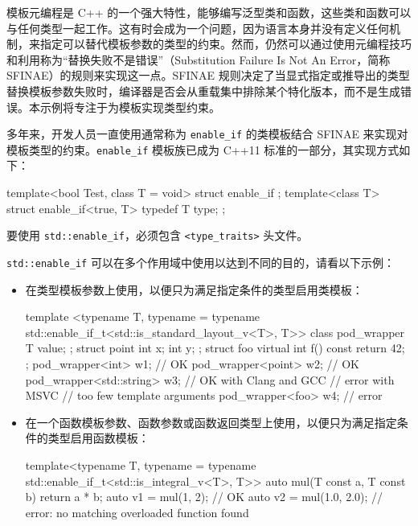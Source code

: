 
模板元编程是 C++ 的一个强大特性，能够编写泛型类和函数，这些类和函数可以与任何类型一起工作。这有时会成为一个问题，因为语言本身并没有定义任何机制，来指定可以替代模板参数的类型的约束。然而，仍然可以通过使用元编程技巧和利用称为“替换失败不是错误”（Substitution Failure Is Not An Error，简称 SFINAE）的规则来实现这一点。SFINAE 规则决定了当显式指定或推导出的类型替换模板参数失败时，编译器是否会从重载集中排除某个特化版本，而不是生成错误。本示例将专注于为模板实现类型约束。


多年来，开发人员一直使用通常称为 \verb|enable_if| 的类模板结合 SFINAE 来实现对模板类型的约束。\verb|enable_if| 模板族已成为 C++11 标准的一部分，其实现方式如下：

\begin{cpp}
template<bool Test, class T = void>
struct enable_if
{};
template<class T>
struct enable_if<true, T>
{
    typedef T type;
};
\end{cpp}

要使用 \verb|std::enable_if|，必须包含 \verb|<type_traits>| 头文件。


\verb|std::enable_if| 可以在多个作用域中使用以达到不同的目的，请看以下示例：

\begin{itemize}
\item
在类型模板参数上使用，以便只为满足指定条件的类型启用类模板：

\begin{cpp}
template <typename T,
          typename = typename
          std::enable_if_t<std::is_standard_layout_v<T>, T>>
class pod_wrapper
{
    T value;
};
struct point
{
    int x;
    int y;
};
struct foo
{
    virtual int f() const
    {
        return 42;
    }
};
pod_wrapper<int>         w1; // OK
pod_wrapper<point>       w2; // OK
pod_wrapper<std::string> w3; // OK with Clang and GCC
                             // error with MSVC
                             // too few template arguments
pod_wrapper<foo>         w4; // error
\end{cpp}

\item
在一个函数模板参数、函数参数或函数返回类型上使用，以便只为满足指定条件的类型启用函数模板：

\begin{cpp}
template<typename T,
         typename = typename std::enable_if_t<std::is_integral_v<T>, T>>
auto mul(T const a, T const b)
{
    return a * b;
}
auto v1 = mul(1, 2);     // OK
auto v2 = mul(1.0, 2.0); // error: no matching overloaded function found
\end{cpp}
\end{itemize}

